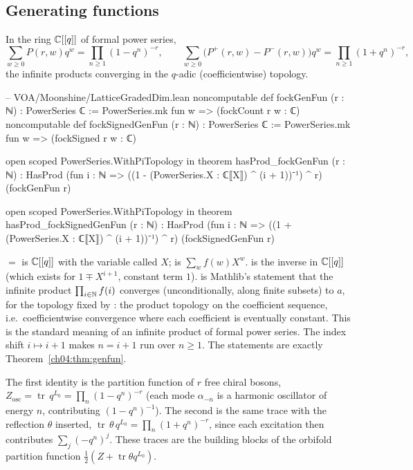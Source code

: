 \subsection{Generating functions}

\begin{theorem}\label{ch04:thm:genfun}
In the ring ${\mathbb{C}}[[q]]$ of formal power series,
\begin{equation*}
  \sum_{w\ge0}P(r,w)q^w=\prod_{n\ge1}(1-q^n)^{-r},
  \qquad
  \sum_{w\ge0}\big(P^+(r,w)-P^-(r,w)\big)q^w=\prod_{n\ge1}(1+q^n)^{-r},
\end{equation*}
the infinite products converging in the $q$-adic (coefficientwise) topology.
\end{theorem}

\begin{leancode}
-- VOA/Moonshine/LatticeGradedDim.lean
noncomputable def fockGenFun (r : ℕ) : PowerSeries ℂ := PowerSeries.mk fun w => (fockCount r w : ℂ)
noncomputable def fockSignedGenFun (r : ℕ) : PowerSeries ℂ :=
  PowerSeries.mk fun w => (fockSigned r w : ℂ)

open scoped PowerSeries.WithPiTopology in
theorem hasProd_fockGenFun (r : ℕ) :
    HasProd (fun i : ℕ => ((1 - (PowerSeries.X : ℂ⟦X⟧) ^ (i + 1))⁻¹) ^ r) (fockGenFun r)

open scoped PowerSeries.WithPiTopology in
theorem hasProd_fockSignedGenFun (r : ℕ) :
    HasProd (fun i : ℕ => ((1 + (PowerSeries.X : ℂ⟦X⟧) ^ (i + 1))⁻¹) ^ r)
      (fockSignedGenFun r)
\end{leancode}

\begin{dictionary}
 $=$  is ${\mathbb{C}}[[q]]$ with the variable called $X$;
 is $\sum_w f(w)X^w$.  is the inverse in ${\mathbb{C}}[[q]]$ (which exists for
$1\mp X^{i+1}$, constant term $1$).  is Mathlib's statement that the infinite
product $\prod_{i\in{\mathbb{N}}}f(i)$ converges (unconditionally, along finite subsets) to $a$, for the
topology fixed by : the product topology on the
coefficient sequence, i.e.\ coefficientwise convergence where each coefficient is eventually
constant. This is the standard meaning of an infinite product of formal power series. The index
shift $i\mapsto i+1$ makes $n=i+1$ run over $n\ge1$. The statements are exactly
Theorem~\ref{ch04:thm:genfun}.
\end{dictionary}

\begin{physics}
The first identity is the partition function of $r$ free chiral bosons, $Z_{\mathrm{osc}}=\operatorname{tr}\,q^{L_0}=\prod_n(1-q^n)^{-r}$ (each mode $\alpha_{-n}$ is a harmonic oscillator of energy $n$, contributing $(1-q^n)^{-1}$). The second is the same trace with the reflection $\theta$ inserted, $\operatorname{tr}\,\theta\,q^{L_0}=\prod_n(1+q^n)^{-r}$, since each excitation then contributes $\sum_j(-q^n)^j$. These traces are the building blocks of the orbifold partition function $\tfrac12(Z+\operatorname{tr}\theta q^{L_0})$.
\end{physics}

